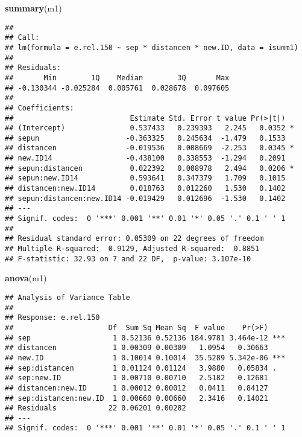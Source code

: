 \documentclass[
]{article}
\newenvironment{Shaded}{\begin{snugshade}}{\end{snugshade}}
\newcommand{\FunctionTok}[1]{\textcolor[rgb]{0.13,0.29,0.53}{\textbf{#1}}}
\newcommand{\NormalTok}[1]{#1}
\begin{document}
\begin{Shaded}
\begin{Highlighting}[]
\FunctionTok{summary}\NormalTok{(m1)}
\end{Highlighting}
\end{Shaded}

\begin{verbatim}
## 
## Call:
## lm(formula = e.rel.150 ~ sep * distancen * new.ID, data = isumm1)
## 
## Residuals:
##       Min        1Q    Median        3Q       Max 
## -0.130344 -0.025284  0.005761  0.028678  0.097605 
## 
## Coefficients:
##                           Estimate Std. Error t value Pr(>|t|)  
## (Intercept)               0.537433   0.239393   2.245   0.0352 *
## sepun                    -0.363325   0.245634  -1.479   0.1533  
## distancen                -0.019536   0.008669  -2.253   0.0345 *
## new.ID14                 -0.438100   0.338553  -1.294   0.2091  
## sepun:distancen           0.022392   0.008978   2.494   0.0206 *
## sepun:new.ID14            0.593641   0.347379   1.709   0.1015  
## distancen:new.ID14        0.018763   0.012260   1.530   0.1402  
## sepun:distancen:new.ID14 -0.019429   0.012696  -1.530   0.1402  
## ---
## Signif. codes:  0 '***' 0.001 '**' 0.01 '*' 0.05 '.' 0.1 ' ' 1
## 
## Residual standard error: 0.05309 on 22 degrees of freedom
## Multiple R-squared:  0.9129, Adjusted R-squared:  0.8851 
## F-statistic: 32.93 on 7 and 22 DF,  p-value: 3.107e-10
\end{verbatim}

\begin{Shaded}
\begin{Highlighting}[]
\FunctionTok{anova}\NormalTok{(m1)}
\end{Highlighting}
\end{Shaded}

\begin{verbatim}
## Analysis of Variance Table
## 
## Response: e.rel.150
##                      Df  Sum Sq Mean Sq  F value    Pr(>F)    
## sep                   1 0.52136 0.52136 184.9781 3.464e-12 ***
## distancen             1 0.00309 0.00309   1.0954   0.30663    
## new.ID                1 0.10014 0.10014  35.5289 5.342e-06 ***
## sep:distancen         1 0.01124 0.01124   3.9880   0.05834 .  
## sep:new.ID            1 0.00710 0.00710   2.5182   0.12681    
## distancen:new.ID      1 0.00012 0.00012   0.0411   0.84127    
## sep:distancen:new.ID  1 0.00660 0.00660   2.3416   0.14021    
## Residuals            22 0.06201 0.00282                       
## ---
## Signif. codes:  0 '***' 0.001 '**' 0.01 '*' 0.05 '.' 0.1 ' ' 1
\end{verbatim}
\end{document}
